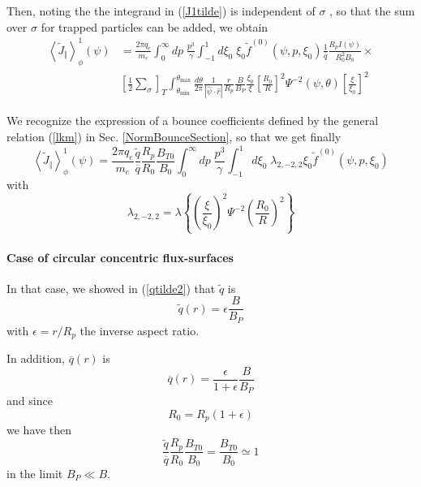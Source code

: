 Then, noting the the integrand in (\ref{J1tilde}) is independent of $\sigma$
, so that the sum over $\sigma$ for trapped particles can be added, we
obtain
\begin{align}
\left\langle \widetilde{J}_{\Vert}\right\rangle _{\phi}^{1}\left(
\psi\right) & =\frac{2\pi q_{e}}{m_{e}}\int_{0}^{\infty}dp\;\frac{p^{3}}{
\gamma}\int_{-1}^{1}d\xi_{0}\;\xi_{0}\widetilde{f}^{(0)}\left( \psi
,p,\xi_{0}\right) \frac{1}{\overline{q}}\frac{R_{p}I\left( \psi\right) }{
R_{0}^{2}B_{0}}\times  \nonumber \\
& \left[ \frac{1}{2}\sum_{\sigma}\right]
_{T}\int_{\theta_{\min}}^{\theta_{\max}}\frac{d\theta}{2\pi}\frac{1}{\left|
\widehat{\psi}\cdot\widehat{r}\right| }\frac{r}{R_{p}}\frac{B}{B_{P}}\frac{
\xi_{0}}{\xi }\left[ \frac{ R_{0}}{R}\right] ^{2}\Psi^{-2}\left(
\psi,\theta\right) \left[ \frac{\xi}{\xi_{0}}\right] ^{2}
\end{align}

We recognize the expression of a bounce coefficients defined by the general
relation (\ref{lkm}) in Sec. \ref{NormBounceSection}, so that we get finally
\begin{equation}
\left\langle \widetilde{J}_{\Vert}\right\rangle _{\phi}^{1}\left(
\psi\right) =\frac{2\pi q_{e}}{m_{e}}\frac{\widetilde{q}}{\overline{q}}\frac{
R_{p}}{R_{0}}\frac{B_{T0}}{B_{0}}\int_{0}^{\infty}dp\;\frac{p^{3}}{\gamma}%
\int_{-1}^{1}d\xi_{0}\;\lambda_{2,-2,2}\xi_{0}\widetilde{f}^{(0)}\left(
\psi,p,\xi_{0}\right)
\end{equation}
with
\begin{equation}
\lambda_{2,-2,2}=\lambda\left\{ \left( \frac{\xi}{\xi_{0}}\right)
^{2}\Psi^{-2}\left( \frac{R_{0}}{R}\right) ^{2}\right\}
\end{equation}

\paragraph{Case of circular concentric flux-surfaces}

In that case, we showed in (\ref{qtilde2}) that $\widetilde{q}$ is
\begin{equation}
\widetilde{q}\left( r\right) =\epsilon\frac{B}{B_{P}}  \label{qtildecirc}
\end{equation}
with $\epsilon=r/R_{p}$ the inverse aspect ratio.

In addition, $\overline{q}\left( r\right) $ is
\begin{equation}
\overline{q}\left( r\right) =\frac{\epsilon}{1+\epsilon}\frac{B}{B_{P}}
\end{equation}
and since
\begin{equation}
R_{0}=R_{p}\left( 1+\epsilon\right)
\end{equation}
we have then
\begin{equation}
\frac{\widetilde{q}}{\overline{q}}\frac{R_{p}}{R_{0}}\frac{B_{T0}}{B_{0}}=%
\frac{B_{T0}}{B_{0}}\simeq1
\end{equation}
in the limit $B_{P}\ll B.$

